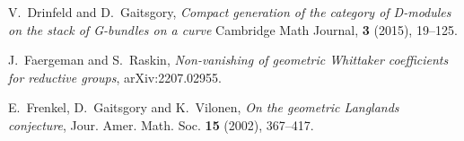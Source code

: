 \documentclass[9pt]{amsart}
\theoremstyle{remark}
\theoremstyle{definition}
\theoremstyle{remark}
\numberwithin{equation}{section}
\begin{document}
\begin{thebibliography}{99}




 V.~Drinfeld and D.~Gaitsgory, {\it Compact generation of the category of D-modules on the stack of G-bundles on a curve}
Cambridge Math Journal, {\bf 3} (2015), 19--125. 

 J.~Faergeman and S.~Raskin, {\it Non-vanishing of geometric Whittaker coefficients for reductive groups}, \newline
arXiv:2207.02955.





 E.~Frenkel, D.~Gaitsgory and K.~Vilonen, {\it On the geometric Langlands conjecture},
Jour. Amer. Math. Soc. {\bf 15} (2002), 367--417. 



\end{thebibliography}
\end{document}
